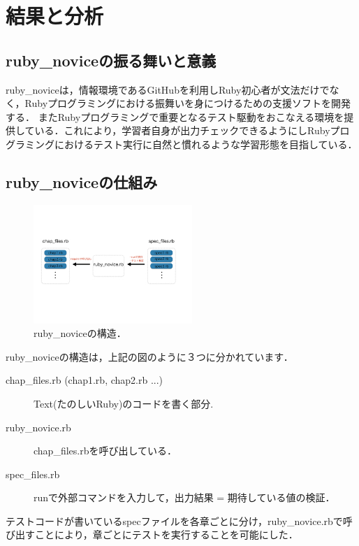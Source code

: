 
\section{結果と分析}
\subsection{ruby\_noviceの振る舞いと意義}
ruby\_noviceは，情報環境であるGitHubを利用しRuby初心者が文法だけでなく，Rubyプログラミングにおける振舞いを身につけるための支援ソフトを開発する．
またRubyプログラミングで重要となるテスト駆動をおこなえる環境を提供している．これにより，学習者自身が出力チェックできるようにしRubyプログラミングにおけるテスト実行に自然と慣れるような学習形態を目指している．

\subsection{ruby\_noviceの仕組み}
\begin{figure}[htbp]\begin{center}
\includegraphics[width=6cm,bb=0 0 442 432]{../figs/./ruby_novice.001.jpg}
\caption{ruby\_noviceの構造．}
\label{default}\end{center}\end{figure}
ruby\_noviceの構造は，上記の図のように３つに分かれています．
\begin{description}
\item[chap\_files.rb (chap1.rb, chap2.rb ...)]  Text(たのしいRuby)のコードを書く部分.

\item[ruby\_novice.rb]   chap\_files.rbを呼び出している．

\item[spec\_files.rb]   runで外部コマンドを入力して，出力結果 = 期待している値の検証．

\end{description}
テストコードが書いているspecファイルを各章ごとに分け，ruby\_novice.rbで呼び出すことにより，章ごとにテストを実行することを可能にした．

